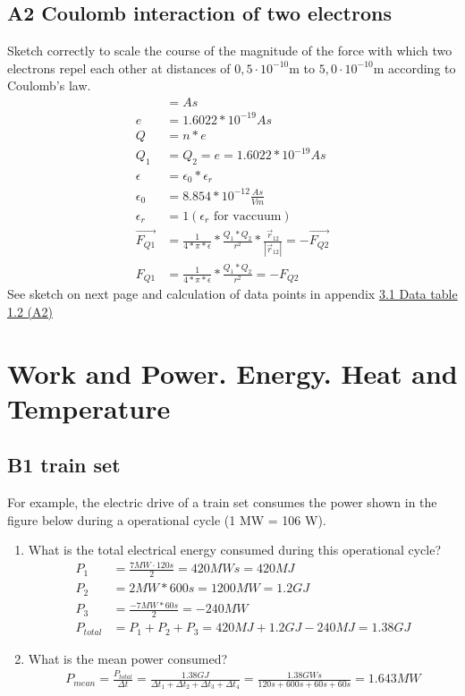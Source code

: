 \documentclass[10pt,ngerman]{scrartcl}
\begin{document}
\subsection{A2 Coulomb interaction of two electrons}
Sketch correctly to scale the course of the magnitude of the force with which two electrons repel each other at distances of $0,5 \cdot 10^{-10}$m to $5,0 \cdot 10^{-10}$m according to Coulomb's law.
\begin{align*}
	[Q] &= As \\
	e &= 1.6022 * 10^{-19} As \\
	Q &= n * e \\
	Q_{1} &= Q_{2} = e = 1.6022 * 10^{-19} As \\
	\epsilon &= \epsilon_{0} * \epsilon_{r} \\
	\epsilon_{0} &= 8.854 * 10^{-12} \frac{As}{Vm} \\
	\epsilon_{r} &= 1 (\epsilon_{r} \text{ for vaccuum})\\
	\vec{F_{Q1}} &= \frac{1}{4 * \pi * \epsilon } * \frac{Q_{1}*Q_{2}}{r^{2}} * \frac{\vec{r}_{12}}{|\vec{r}_{12}|} = -\vec{F_{Q2}} \\
	F_{Q1} &= \frac{1}{4 * \pi * \epsilon } * \frac{Q_{1}*Q_{2}}{r^{2}} = -F_{Q2}
\end{align*}
See sketch on next page and calculation of data points in appendix \hyperref[sec:data-table-a2]{3.1 Data table 1.2 (A2)}

\begin{landscape}
 
\end{landscape}

\newpage
\section{Work and Power. Energy. Heat and Temperature}
\subsection{B1 train set}
For example, the electric drive of a train set consumes the power shown in the figure below during a operational cycle (1 MW = 106 W).

\begin{enumerate}
	\item What is the total electrical energy consumed during this operational cycle?
	\begin{align*}
		P_{1} &= \frac{7MW\cdot 120s}{2} = 420MWs = 420MJ\\
		P_{2} &= 2 MW * 600s = 1200 MW = 1.2 GJ\\
		P_{3} &= \frac{-7MW * 60s}{2} = -240 MW\\
		P_{total} &= P_{1} + P_{2} + P_{3} = 420MJ + 1.2 GJ - 240 MJ = 1.38 GJ
	\end{align*}
	\item What is the mean power consumed?
	\begin{align*}
        P_{mean} = \frac{P_{total}}{\Delta t} = \frac{1.38 GJ}{\Delta t_{1} +\Delta t_{2} +\Delta t_{3} +\Delta t_{4}}
		= \frac{1.38GWs}{120s + 600s + 60s + 60s} = 1.643MW
  \end{align*}
\end{enumerate}
\end{document}
